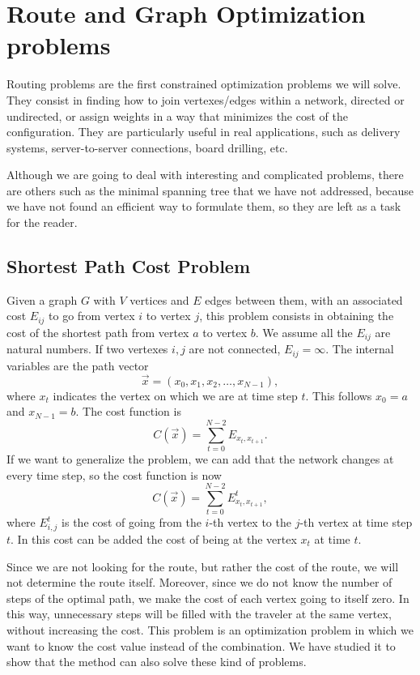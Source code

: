 \section{Route and Graph Optimization problems}
Routing problems are the first constrained optimization problems we will solve. They consist in finding how to join vertexes/edges within a network, directed or undirected, or assign weights in a way that minimizes the cost of the configuration. They are particularly useful in real applications, such as delivery systems, server-to-server connections, board drilling, etc.

Although we are going to deal with interesting and complicated problems, there are others such as the minimal spanning tree that we have not addressed, because we have not found an efficient way to formulate them, so they are left as a task for the reader.

\subsection{Shortest Path Cost Problem}
Given a graph $G$ with $V$ vertices and $E$ edges between them, with an associated cost $E_{ij}$ to go from vertex $i$ to vertex $j$, this problem consists in obtaining the cost of the shortest path from vertex $a$ to vertex $b$. We assume all the $E_{ij}$ are natural numbers. If two vertexes $i,j$ are not connected, $E_{ij}=\infty$. The internal variables are the path vector
\begin{equation}
    \vec{x} = (x_0,x_1,x_2, \dots, x_{N-1}),
\end{equation}
where $x_t$ indicates the vertex on which we are at time step $t$. This follows $x_0=a$ and $x_{N-1}=b$. The cost function is
\begin{equation}
    C(\vec{x})=\sum_{t=0}^{N-2} E_{x_t,x_{t+1}}.
\end{equation}
If we want to generalize the problem, we can add that the network changes at every time step, so the cost function is now
\begin{equation}
    C(\vec{x})=\sum_{t=0}^{N-2} E^t_{x_t,x_{t+1}},
\end{equation}
where $E^t_{i,j}$ is the cost of going from the $i$-th vertex to the $j$-th vertex at time step $t$. In this cost can be added the cost of being at the vertex $x_t$ at time $t$.

Since we are not looking for the route, but rather the cost of the route, we will not determine the route itself. Moreover, since we do not know the number of steps of the optimal path, we make the cost of each vertex going to itself zero. In this way, unnecessary steps will be filled with the traveler at the same vertex, without increasing the cost. This problem is an optimization problem in which we want to know the cost value instead of the combination. We have studied it to show that the method can also solve these kind of problems.


